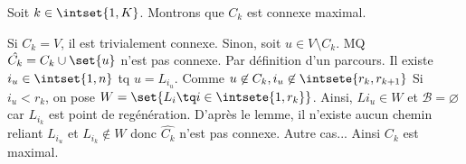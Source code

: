 \documentclass{scrartcl}
\begin{document}
			\begin{demo}
				\item Soit $k \in \intset{1,K}$. Montrons que $C_k$ est connexe maximal.
				\item Si $C_k = V$, il est trivialement connexe. Sinon, soit $u\in V\setminus C_k$. MQ $\hat{C_k} = C_k\cup\set{u}$  n'est pas connexe.
				Par définition d'un parcours. Il existe $i_u \in \intset{1,n}$ tq $u = L_{i_u}$.
				Comme $u \not\in C_k, i_u \not\in \intsete{r_k,r_{k+1}}$
				Si $i_u < r_k$, on pose $W = \set{L_i \tq i \in \intsete{1,r_k}}$. Ainsi, $L{i_u} \in W$ et $\mathcal{B} = \varnothing$ car 
				$L_{i_k}$ est point de regénération. D'après le lemme, il n'existe aucun chemin reliant $L_{i_u}$ et $L_{i_k} \not \in W$
				donc $\hat{C_k}$ n'est pas connexe.
				Autre cas...
				Ainsi $C_k$ est maximal.
			\end{demo}
\end{document}
